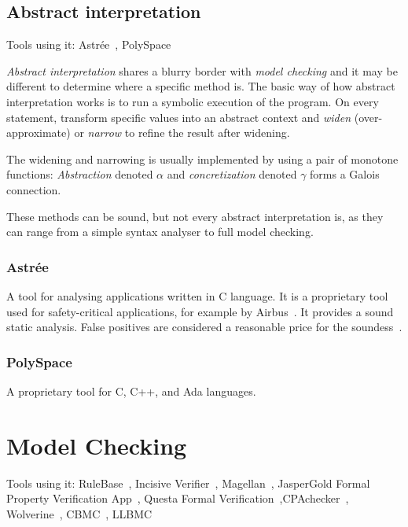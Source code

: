 \subsection{Abstract interpretation}
Tools using it: Astrée~\cite{Astree1,KrenaVojnarOverview}, PolySpace~\cite{KrenaVojnarOverview}

{\em Abstract interpretation} shares a blurry border with {\em model checking} and it may be different to determine where a specific method is. The basic way of how abstract interpretation works is to run a symbolic execution of the program. On every statement, transform specific values into an abstract context and {\em widen} (over-approximate) or {\em narrow} to refine the result after widening.

The widening and narrowing is usually implemented by using a pair of monotone functions: {\em Abstraction} denoted $\alpha$ and {\em concretization} denoted $\gamma$ forms a Galois connection.

These methods can be sound, but not every abstract interpretation is, as they can range from a simple syntax analyser to full model checking.

\subsubsection{Astrée}
A tool for analysing applications written in C language. It is a proprietary tool used for safety-critical applications, for example by Airbus~\cite{KrenaVojnarOverview}. It provides a sound static analysis. False positives are considered a reasonable price for the soundess~\cite{Astree1}.

\subsubsection{PolySpace}
A proprietary tool for C, C++, and Ada languages.

\section{Model Checking}\label{chap:fav:modelChecking}
Tools using it: RuleBase~\cite{KrenaVojnarOverview}, Incisive Verifier~\cite{KrenaVojnarOverview}, Magellan~\cite{KrenaVojnarOverview}, JasperGold Formal Property Verification App~\cite{KrenaVojnarOverview}, Questa Formal Verification~\cite{KrenaVojnarOverview},CPAchecker~\cite{KrenaVojnarOverview}, Wolverine~\cite{KrenaVojnarOverview}, CBMC~\cite{KrenaVojnarOverview}, LLBMC~\cite{KrenaVojnarOverview}

